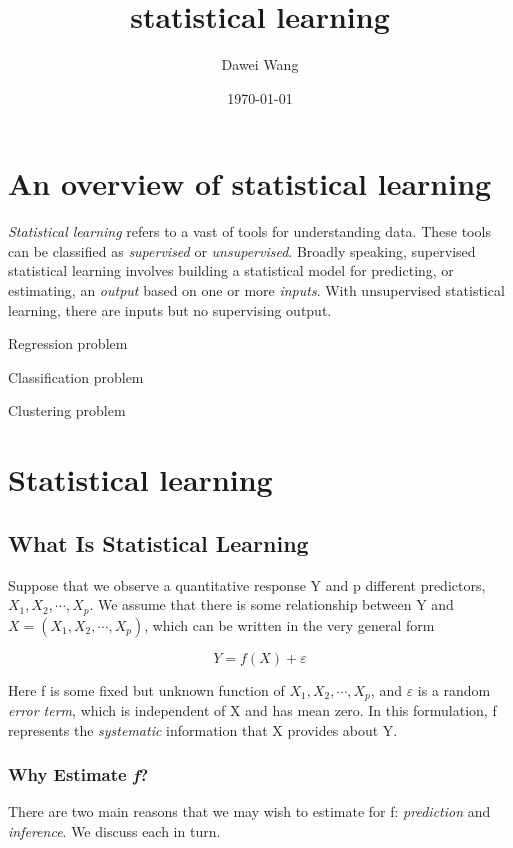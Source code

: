 \documentclass{article}
\date{\today}
\title{statistical learning}
\author{Dawei Wang}
\theoremstyle{definition}
\theoremstyle{remark}
\begin{document}
	\maketitle

\section*{An overview of statistical learning}\noindent

\textit{Statistical learning} refers to a vast of tools for understanding data.
These tools can be classified as \textit{supervised} or \textit{unsupervised}. Broadly speaking, supervised statistical learning involves building a statistical model for predicting, or estimating, an \textit{output} based on one or more \textit{inputs}. With unsupervised statistical learning, there are inputs but no supervising output.

Regression problem

Classification problem 

Clustering problem

\section*{Statistical learning}

\subsection*{What Is Statistical Learning}\noindent

Suppose that we observe a quantitative response Y and
p different predictors, $X_1, X_2,\cdots, X_p$. We assume that there is some relationship between Y and $X=(X_1, X_2, \cdots, X_p)$, which can be written in the very general form

\[
Y=f(X)+\varepsilon
\]

Here f is some fixed but unknown function of $X_1, X_2,\cdots, X_p$, and $\varepsilon$ is a random \textit{error term}, which is independent of X and has mean zero. In this formulation, f represents the \textit{systematic} information that X provides about Y.

\subsubsection*{Why Estimate \textit{f}?}
There are two main reasons that we may wish to estimate for f: \textit{prediction} and \textit{inference}. We discuss each in turn.
\end{document}
